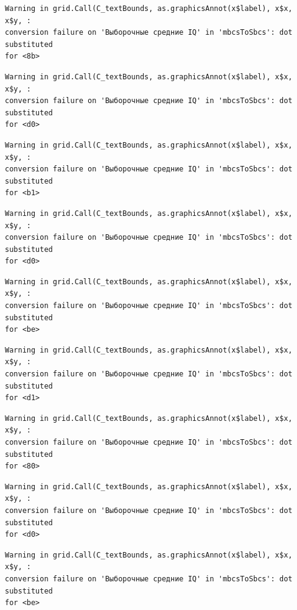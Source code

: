 \documentclass[
  letterpaper,
  DIV=11,
  numbers=noendperiod]{scrreprt}
\theoremstyle{definition}
\theoremstyle{remark}
\begin{document}
\begin{verbatim}
Warning in grid.Call(C_textBounds, as.graphicsAnnot(x$label), x$x, x$y, :
conversion failure on 'Выборочные средние IQ' in 'mbcsToSbcs': dot substituted
for <8b>
\end{verbatim}

\begin{verbatim}
Warning in grid.Call(C_textBounds, as.graphicsAnnot(x$label), x$x, x$y, :
conversion failure on 'Выборочные средние IQ' in 'mbcsToSbcs': dot substituted
for <d0>
\end{verbatim}

\begin{verbatim}
Warning in grid.Call(C_textBounds, as.graphicsAnnot(x$label), x$x, x$y, :
conversion failure on 'Выборочные средние IQ' in 'mbcsToSbcs': dot substituted
for <b1>
\end{verbatim}

\begin{verbatim}
Warning in grid.Call(C_textBounds, as.graphicsAnnot(x$label), x$x, x$y, :
conversion failure on 'Выборочные средние IQ' in 'mbcsToSbcs': dot substituted
for <d0>
\end{verbatim}

\begin{verbatim}
Warning in grid.Call(C_textBounds, as.graphicsAnnot(x$label), x$x, x$y, :
conversion failure on 'Выборочные средние IQ' in 'mbcsToSbcs': dot substituted
for <be>
\end{verbatim}

\begin{verbatim}
Warning in grid.Call(C_textBounds, as.graphicsAnnot(x$label), x$x, x$y, :
conversion failure on 'Выборочные средние IQ' in 'mbcsToSbcs': dot substituted
for <d1>
\end{verbatim}

\begin{verbatim}
Warning in grid.Call(C_textBounds, as.graphicsAnnot(x$label), x$x, x$y, :
conversion failure on 'Выборочные средние IQ' in 'mbcsToSbcs': dot substituted
for <80>
\end{verbatim}

\begin{verbatim}
Warning in grid.Call(C_textBounds, as.graphicsAnnot(x$label), x$x, x$y, :
conversion failure on 'Выборочные средние IQ' in 'mbcsToSbcs': dot substituted
for <d0>
\end{verbatim}

\begin{verbatim}
Warning in grid.Call(C_textBounds, as.graphicsAnnot(x$label), x$x, x$y, :
conversion failure on 'Выборочные средние IQ' in 'mbcsToSbcs': dot substituted
for <be>
\end{verbatim}
\end{document}
